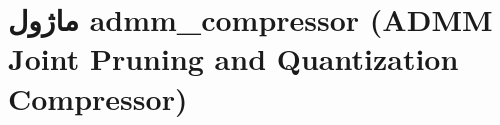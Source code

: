 \section{ماژول admm\_compressor (ADMM Joint Pruning and Quantization Compressor)}
\label{sec:module_admm_compressor}
